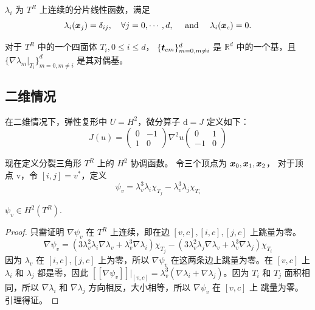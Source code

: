 \documentclass[letterpaper,12pt]{article}
\begin{document}
$\lambda_i$ 为 $T^R$ 上连续的分片线性函数，满足
$$
\lambda_i(\boldsymbol{x}_j) = \delta_{ij}, \quad \forall j = 0, \cdots, d, \quad 
\text{ and } \quad \lambda_i(\boldsymbol{x}_c) = 0.
$$
\begin{lemma}
\label{lem:dual}
对于 $T^R$ 中的一个四面体 $T_i, 0\leq i \leq d$，
$\{\boldsymbol{t}_{cm}\}_{m=0, m\not=i}^d$ 是 $\mathbb{R}^d$ 中的一个基，且 
$\{\nabla \lambda_{m}|_{T_i}\}_{m=0, m\not=i}^d$ 是其对偶基。
\end{lemma}

\subsection{二维情况}
在二维情况下，弹性复形中 $U = H^2$，微分算子 $\mathrm{d} = J$ 定义如下： 
\begin{equation}
\label{eq:Jdef}
J(u) = 
\begin{pmatrix}
  0 & -1\\ 1 & 0
\end{pmatrix}
\nabla^2 u 
\begin{pmatrix}
  0 & 1\\ -1 & 0
\end{pmatrix}
\end{equation}

现在定义分裂三角形 $T^R$ 上的 $H^2$ 协调函数。
令三个顶点为 $\boldsymbol{x}_0, \boldsymbol{x}_1, \boldsymbol{x}_2$，
对于顶点 \textsf{v}，令 $[i, j] = v^*$，定义
$$
\psi_{v} = \lambda_v^3 \lambda_i \chi_{T_j} - \lambda_v^3 \lambda_j \chi_{T_i}
$$
\begin{lemma}
    $\psi_v \in H^2(T^R)$.
\end{lemma}
\begin{proof}
    只需证明 $\nabla\psi_v$ 在 $T^R$ 上连续，即在边 $[v, c], [i, c], [j, c]$
    上跳量为零。
    $$
    \nabla \psi_v = 
    (3\lambda_v^2\lambda_i \nabla \lambda_v + \lambda_v^3 \nabla \lambda_i)
    \chi_{T_j} -
    (3\lambda_v^2\lambda_j \nabla \lambda_v + \lambda_v^3 \nabla \lambda_j)
    \chi_{T_i} 
    $$
    因为 $\lambda_v$ 在 $[i, c], [j, c]$ 上为零，所以 $\nabla\psi_v$
    在这两条边上跳量为零。在 $[v, c]$ 上 $\lambda_i$ 和 $\lambda_j$ 都是零，因此
    $[\![\nabla\psi_v]\!]|_{[v, c]} = \lambda_v^3 (\nabla \lambda_i + \nabla
    \lambda_j)$。因为 $T_i$ 和 $T_j$ 面积相同，所以 $\nabla \lambda_i$ 和 
    $\nabla \lambda_j$ 方向相反，大小相等，所以 $\nabla\psi_v$ 在 $[v, c]$ 上
    跳量为零。引理得证。
\end{proof}
\end{document}
